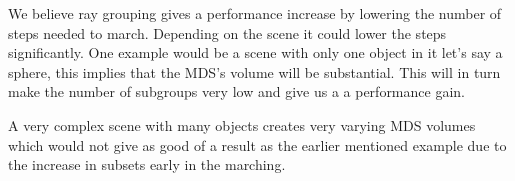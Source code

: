 			We believe ray grouping gives a performance increase by lowering the
			number of steps needed to march. Depending on the scene it could lower
			the steps significantly. One example would be a scene with only one
			object in it let's say a sphere, this implies that the MDS's volume will
			be substantial. This will in turn make the number of subgroups very low
			and give us a a performance gain. 
			
			A very complex scene with many objects creates very varying MDS volumes
			which would not give as good of a result as the earlier mentioned example
			due to the increase in subsets early in the marching.
			
